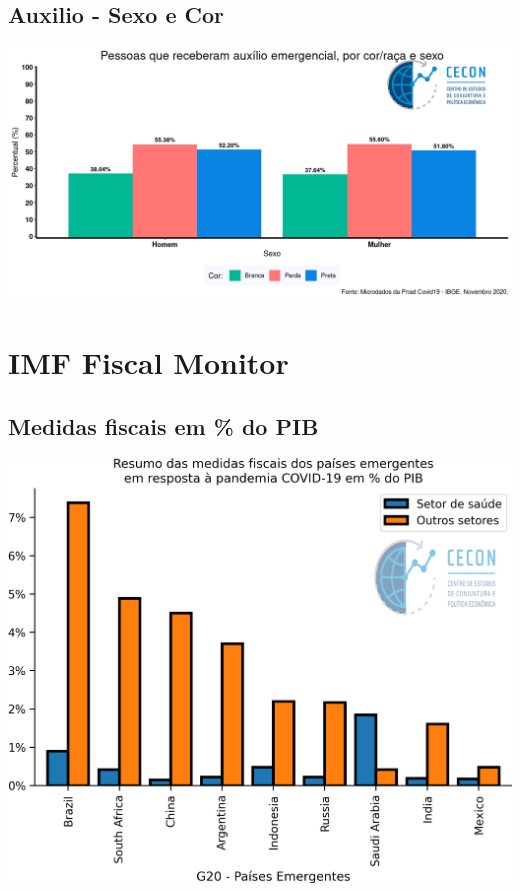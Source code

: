 \documentclass{SelfArx}
\begin{document}
\subsection*{Auxilio - Sexo e Cor}
\label{sec:orgbfc76ec}
\begin{center}
\includegraphics[width=.9\linewidth]{./figs/PNAD_COVID/auxilio_cor_sexo.png}
\end{center}


\section*{IMF Fiscal Monitor}
\label{sec:org736eb4a}
\subsection*{Medidas fiscais em \% do PIB}
\label{sec:org39cbf90}

\begin{center}
\includegraphics[width=.9\linewidth]{./figs/IMF/FiscalMonitor_Covid.png}
\end{center}
\end{document}
